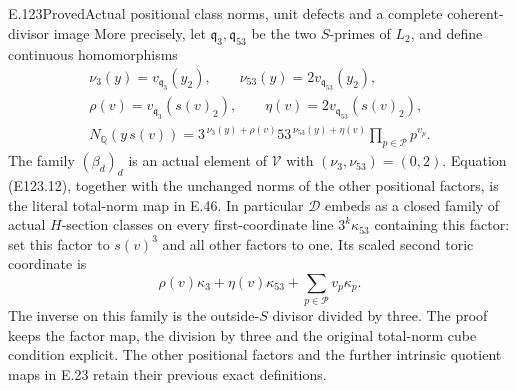 \begin{statement}{E.123}{Proved}{Actual positional class norms, unit defects and a complete coherent-divisor image}
More precisely, let $\mathfrak q_3,\mathfrak q_{53}$ be the two
$S$-primes of $L_2$, and define continuous homomorphisms
\[
 \begin{gathered}
 \nu_3(y)=v_{\mathfrak q_3}(y_2),\qquad
 \nu_{53}(y)=2v_{\mathfrak q_{53}}(y_2),\\
 \rho(v)=v_{\mathfrak q_3}(s(v)_2),\qquad
 \eta(v)=2v_{\mathfrak q_{53}}(s(v)_2),\\
 N_{\mathbb Q}(y\,s(v))
   =3^{\,\nu_3(y)+\rho(v)}53^{\,\nu_{53}(y)+\eta(v)}
       \prod_{p\in\mathcal P}p^{v_p}.
 \end{gathered}
 \tag{E123.12}
\]
The family $(\beta_d)_d$ is an actual element of $\mathcal V$ with
$(\nu_3,\nu_{53})=(0,2)$. Equation (E123.12), together with the
unchanged norms of the other positional factors, is the literal
total-norm map in E.46. In particular $\mathcal D$ embeds as a closed
family of actual $H$-section classes on every first-coordinate line
$3^k\kappa_{53}$ containing this factor: set this factor to $s(v)^3$
and all other factors to one. Its scaled second toric coordinate is
\[
       \rho(v)\kappa_3+\eta(v)\kappa_{53}
                 +\sum_{p\in\mathcal P}v_p\kappa_p .
 \tag{E123.13}
\]
The inverse on this family is the outside-$S$ divisor divided by
three. The proof keeps the factor map, the division by three and
the original total-norm cube condition explicit. The other positional
factors and the further intrinsic quotient maps in E.23 retain their
previous exact definitions.
\end{statement}

